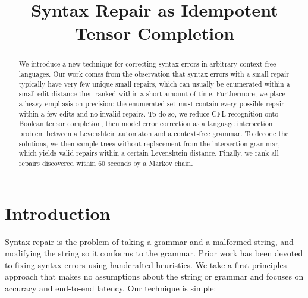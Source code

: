 \documentclass[sigplan,review,anonymous,acmsmall]{acmart}\settopmatter{printfolios=false,printccs=false,printacmref=false}
\begin{document}
%
  \title{Syntax Repair as Idempotent Tensor Completion}
  \begin{abstract}
    We introduce a new technique for correcting syntax errors in arbitrary context-free languages. Our work comes from the observation that syntax errors with a small repair typically have very few unique small repairs, which can usually be enumerated within a small edit distance then ranked within a short amount of time. Furthermore, we place a heavy emphasis on precision: the enumerated set must contain every possible repair within a few edits and no invalid repairs. To do so, we reduce CFL recognition onto Boolean tensor completion, then model error correction as a language intersection problem between a Levenshtein automaton and a context-free grammar. To decode the solutions, we then sample trees without replacement from the intersection grammar, which yields valid repairs within a certain Levenshtein distance. Finally, we rank all repairs discovered within 60 seconds by a Markov chain.
  \end{abstract}
%
%
%
%
%
  \maketitle              %


  \section{Introduction}

  Syntax repair is the problem of taking a grammar and a malformed string, and modifying the string so it conforms to the grammar. Prior work has been devoted to fixing syntax errors using handcrafted heuristics. We take a first-principles approach that makes no assumptions about the string or grammar and focuses on accuracy and end-to-end latency. Our technique is simple:
\end{document}
